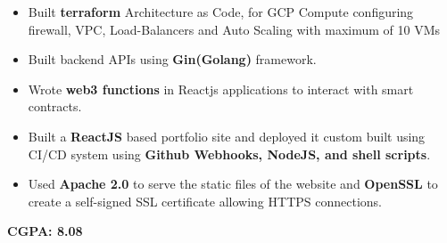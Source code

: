 \documentclass[10pt,a4paper,ragged2e,withhyper]{altacv}
\begin{document}
\begin{paracol}{2}
\divider\smallskip




\begin{itemize}
\item Built {\bf terraform} Architecture as Code, for GCP Compute configuring firewall, VPC, Load-Balancers and Auto Scaling with maximum of 10 VMs
\item Built backend APIs using {\bf Gin(Golang)} framework.
\item Wrote {\bf web3 functions} in Reactjs applications to interact with smart contracts.
\end{itemize}


\begin{itemize}
\item Built a {\bf ReactJS} based portfolio site and deployed it custom built using CI/CD system using {\bf Github Webhooks, NodeJS, and shell scripts}.
\item Used {\bf Apache 2.0} to serve the static files of the website and {\bf OpenSSL} to create a self-signed SSL certificate allowing HTTPS connections.
\end{itemize}

\divider\smallskip


{\bf CGPA: 8.08} 
\end{paracol}
\end{document}
